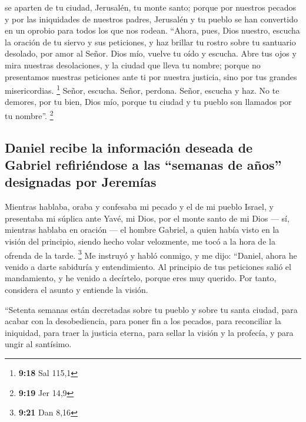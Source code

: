 \begin{paracol}{2}
se aparten de tu ciudad, Jerusalén, tu monte santo; porque por nuestros
pecados y por las iniquidades de nuestros padres, Jerusalén y tu pueblo
se han convertido en un oprobio para todos los que nos rodean.
 ``Ahora, pues, Dios nuestro, escucha la oración de tu
siervo y sus peticiones, y haz brillar tu rostro sobre tu santuario
desolado, por amor al Señor.  Dios mío, vuelve tu oído y
escucha. Abre tus ojos y mira nuestras desolaciones, y la ciudad que
lleva tu nombre; porque no presentamos nuestras peticiones ante ti por
nuestra justicia, sino por tus grandes misericordias. \footnote{\textbf{9:18}
  Sal 115,1}  Señor, escucha. Señor, perdona. Señor,
escucha y haz. No te demores, por tu bien, Dios mío, porque tu ciudad y
tu pueblo son llamados por tu nombre''. \footnote{\textbf{9:19} Jer 14,9}

\hypertarget{daniel-recibe-la-informaciuxf3n-deseada-de-gabriel-refiriuxe9ndose-a-las-semanas-de-auxf1os-designadas-por-jeremuxedas}{%
\subsection{Daniel recibe la información deseada de Gabriel refiriéndose
a las ``semanas de años'' designadas por
Jeremías}\label{daniel-recibe-la-informaciuxf3n-deseada-de-gabriel-refiriuxe9ndose-a-las-semanas-de-auxf1os-designadas-por-jeremuxedas}}

 Mientras hablaba, oraba y confesaba mi pecado y el de mi
pueblo Israel, y presentaba mi súplica ante Yavé, mi Dios, por el monte
santo de mi Dios ---  sí, mientras hablaba en oración ---
el hombre Gabriel, a quien había visto en la visión del principio,
siendo hecho volar velozmente, me tocó a la hora de la ofrenda de la
tarde. \footnote{\textbf{9:21} Dan 8,16}  Me instruyó y
habló conmigo, y me dijo: ``Daniel, ahora he venido a darte sabiduría y
entendimiento.  Al principio de tus peticiones salió el
mandamiento, y he venido a decírtelo, porque eres muy querido. Por
tanto, considera el asunto y entiende la visión.

 ``Setenta semanas están decretadas sobre tu pueblo y
sobre tu santa ciudad, para acabar con la desobediencia, para poner fin
a los pecados, para reconciliar la iniquidad, para traer la justicia
eterna, para sellar la visión y la profecía, y para ungir al santísimo.


\end{paracol}
